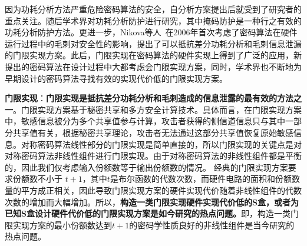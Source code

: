\documentclass[a4paper,zihao=-4,AutoFakeBold]{ctexart}
\begin{document}



因为功耗分析方法严重危险密码算法的安全，自分析方案提出后就受到了研究者的重点关注。随后学术界对功耗分析防护进行研究，其中掩码防护是一种行之有效的功耗分析防护方法。更进一步，Nikova等人~\cite{Nikova06TI}在2006年首次考虑了密码算法在硬件运行过程中的毛刺对安全性的影响，提出了可以抵抗差分功耗分析和毛刺信息泄漏的门限实现方案。此后，门限实现在密码算法的硬件实现上得到了广泛的应用，新提出的密码算法在设计过程中大都考虑会门限实现方案，同时，学术界也不断地为早期设计的密码算法寻找有效的实现代价低的门限实现方案。

\textbf{门限实现}：\textbf{门限实现是抵抗差分功耗分析和毛刺造成的信息泄露的最有效的方法之一}。门限实现方案基于秘密共享和多方安全计算技术。具体而言，在门限实现方案中，敏感信息被分为多个共享值参与计算，攻击者获得的侧信道信息只与其中一部分共享值有关，根据秘密共享理论，攻击者无法通过这部分共享值恢复原始敏感信息。对称密码算法线性部分的门限实现是简单直接的，所以门限实现的关键点是对对称密码算法非线性组件进行门限实现。由于对称密码算法的非线性组件都是平衡的，因此我们仅考虑输入份额数等于输出份额数的情况。
经典的门限实现方案要求份额数不小于 $t+1$，其中$t$是布尔函数的代数次数，而硬件电路的面积和份额数量的平方成正相关，因此导致门限实现方案的硬件实现代价随着非线性组件的代数次数的增加而大幅增加。所以，\textbf{构造一类门限实现硬件实现代价低的S盒，或者为已知S盒设计硬件代价低的门限实现方案是如今研究的热点问题。}即，构造一类门限实现方案的最小份额数达到$t+1$的密码学性质良好的非线性组件是当今研究的热点问题。
\end{document}
